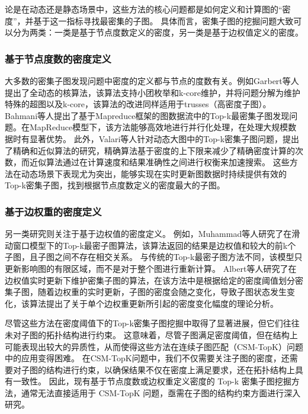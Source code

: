 论是在动态还是静态场景中，这些方法的核心问题都是如何定义和计算图的“密度”，并基于这一指标寻找最密集的子图。
具体而言，密集子图的挖掘问题大致可以分为两类：一类是基于节点度数定义的密度，另一类是基于边权值定义的密度。

\subsubsection{基于节点度数的密度定义}
大多数的密集子图发现问题中密度的定义都与节点的度数有关。例如Garbert等人\cite{dsm-noweight-Gabert-DBLP:conf/wsdm/GabertPC21}提出了全动态的核算法，该算法支持小团枚举和k-core维护，并将问题分解为维护特殊的超图以及k-core，该算法的改进同样适用于trusses（高密度子图）。
Bahmani等人\cite{dsm-noweight-Bahmani-DBLP:journals/pvldb/BahmaniKV12}提出了基于Mapreduce框架的图数据流中的Top-k最密集子图发现问题。在MapReduce模型\cite{csm-mapreduce-DBLP:journals/cacm/DeanG08}下，该方法能够高效地进行并行化处理，在处理大规模数据时有显著优势。
此外，Valari等人\cite{dsm-noweight-Valari-DBLP:conf/ssdbm/ValariKP12}针对动态大图中的Top-k密集子图问题，提出了精确和近似算法的研究，精确算法基于密度的上下限来减少了精确密度计算的次数，而近似算法通过在计算速度和结果准确性之间进行权衡来加速搜索。
这些方法在动态场景下表现尤为突出，能够实现在实时更新图数据时持续提供有效的Top-k密集子图，找到根据节点度数定义的密度最大的子图。

\subsubsection{基于边权重的密度定义}
另一类研究则关注于基于边权值的密度定义。
例如，Muhammad\cite{dsm-weight-Muhammad-DBLP:conf/cikm/NasirGMG17}等人研究了在滑动窗口模型下的Top-k最密子图算法，该算法返回的结果是边权值和较大的前k个子图，且子图之间不存在相交关系。
与传统的Top-k最密子图方法不同，该模型只更新影响图的有限区域，而不是对于整个图进行重新计算。
Albert等人\cite{dsm-weight-Angel-DBLP:journals/vldb/AngelKSSST14}研究了在边权值实时更新下维护密集子图的算法，在该方法中是根据给定的密度阈值划分密集子图，随着边权重的实时更新，子图的密度会随之变化，导致子图状态发生变化，该算法提出了关于单个边权重更新所引起的密度变化幅度的理论分析。

尽管这些方法在密度阈值下的Top-k密集子图挖掘中取得了显著进展，但它们往往未对子图的拓扑结构进行约束。
这意味着，尽管子图满足密度阈值，但在结构上可能表现出较大的异质性，从而使得这些方法在连续子图匹配（CSM-TopK）问题中的应用变得困难。
在CSM-TopK问题中，我们不仅需要关注子图的密度，还需要对子图的结构进行约束，以确保结果不仅在密度上满足要求，还在拓扑结构上具有一致性。
因此，现有基于节点度数或边权重定义密度的 Top-k 密集子图挖掘方法，通常无法直接适用于 CSM-TopK 问题，亟需在子图的结构约束方面进行深入研究。

